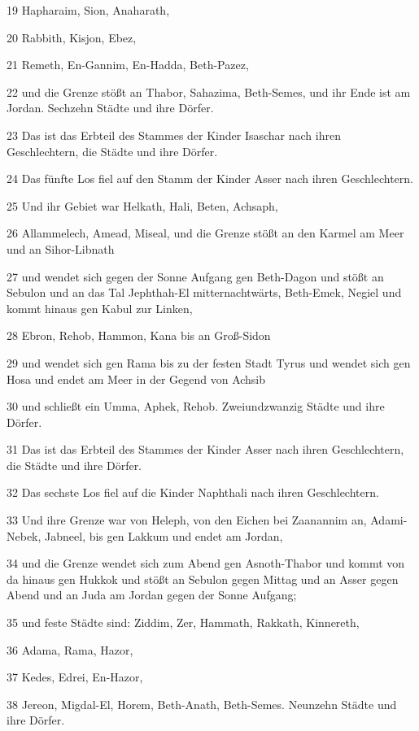 \par 19 Hapharaim, Sion, Anaharath,
\par 20 Rabbith, Kisjon, Ebez,
\par 21 Remeth, En-Gannim, En-Hadda, Beth-Pazez,
\par 22 und die Grenze stößt an Thabor, Sahazima, Beth-Semes, und ihr Ende ist am Jordan. Sechzehn Städte und ihre Dörfer.
\par 23 Das ist das Erbteil des Stammes der Kinder Isaschar nach ihren Geschlechtern, die Städte und ihre Dörfer.
\par 24 Das fünfte Los fiel auf den Stamm der Kinder Asser nach ihren Geschlechtern.
\par 25 Und ihr Gebiet war Helkath, Hali, Beten, Achsaph,
\par 26 Allammelech, Amead, Miseal, und die Grenze stößt an den Karmel am Meer und an Sihor-Libnath
\par 27 und wendet sich gegen der Sonne Aufgang gen Beth-Dagon und stößt an Sebulon und an das Tal Jephthah-El mitternachtwärts, Beth-Emek, Negiel und kommt hinaus gen Kabul zur Linken,
\par 28 Ebron, Rehob, Hammon, Kana bis an Groß-Sidon
\par 29 und wendet sich gen Rama bis zu der festen Stadt Tyrus und wendet sich gen Hosa und endet am Meer in der Gegend von Achsib
\par 30 und schließt ein Umma, Aphek, Rehob. Zweiundzwanzig Städte und ihre Dörfer.
\par 31 Das ist das Erbteil des Stammes der Kinder Asser nach ihren Geschlechtern, die Städte und ihre Dörfer.
\par 32 Das sechste Los fiel auf die Kinder Naphthali nach ihren Geschlechtern.
\par 33 Und ihre Grenze war von Heleph, von den Eichen bei Zaanannim an, Adami-Nebek, Jabneel, bis gen Lakkum und endet am Jordan,
\par 34 und die Grenze wendet sich zum Abend gen Asnoth-Thabor und kommt von da hinaus gen Hukkok und stößt an Sebulon gegen Mittag und an Asser gegen Abend und an Juda am Jordan gegen der Sonne Aufgang;
\par 35 und feste Städte sind: Ziddim, Zer, Hammath, Rakkath, Kinnereth,
\par 36 Adama, Rama, Hazor,
\par 37 Kedes, Edrei, En-Hazor,
\par 38 Jereon, Migdal-El, Horem, Beth-Anath, Beth-Semes. Neunzehn Städte und ihre Dörfer.
